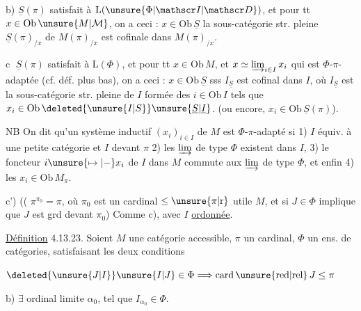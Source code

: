 
b) $\underline S(\pi)$ satisfait à $\mathrm L(\unsure{\Phi|\mathscr I|\mathscr D})$, et pour tt $x\in\mathrm{Ob}\,\unsure{M|\mathcal M}$, on a ceci : $x\in\mathrm{Ob}\,\underline S$  la sous-catégorie str. pleine $\underline S(\pi)_{/x}$ de $M(\pi)_{/x}$ est cofinale dans $M(\pi)_{/x}$.

\textcircled{c} $\underline S(\pi)$ satisfait à $\mathrm L(\Phi)$, et pour tt $x\in\mathrm{Ob}\,M$, et    $x\simeq\varinjlim_{i\in I}x_i$ qui est $\Phi$-$\pi$-adaptée (cf. déf. plus bas), on a ceci : $x\in\mathrm{Ob}\,\underline S$ sss $I_{\underline S}$ est cofinal dans $I$, où $I_{\underline S}$ est la sous-catégorie str. pleine de $I$ formée des $i\in\mathrm{Ob}\,I$ tels que $x_i\in\mathrm{Ob}\,\deleted{\unsure{I|S}}\unsure{\underline S|\underline I}$. (ou encore, $x_i\in\mathrm{Ob}\,\underline S(\pi)$).

NB On dit qu'un système inductif $(x_i)_{i\in I}$ de $M$ est $\Phi$-$\pi$-adapté si 1) $I$ équiv. à une petite catégorie et $I$  devant $\pi$ 2) les $\varinjlim$ de type $\Phi$ existent dans $I$, 3) le foncteur $i\unsure{\mapsto|-}x_i$ de $I$ dans $M$ commute aux $\varinjlim$ de type $\Phi$, et enfin 4) les $x_i\in\mathrm{Ob}\,M_\pi$.

c') (( $\pi^{\pi_0}=\pi$, où $\pi_0$ est un cardinal $\leq\unsure{\pi|\mathrm r}$ utile  $M$,  et si   $J\in\Phi$ implique que $J$ est grd devant $\pi_0$) Comme c), avec $I$ \uline{ordonnée}.




\uline{Définition} 4.13.23. Soient $M$ une catégorie accessible, $\pi$  un cardinal, $\Phi$ un ens. de catégories, satisfaisant les deux conditions

 $\deleted{\unsure{J|I}}\unsure{I|J}\in\Phi\Longrightarrow\mathrm{card}\,\unsure{\mathrm{red}|\mathrm{rel}}\,J\leq\pi$

b) $\exists$ ordinal limite $\alpha_0$, tel que $I_{\alpha_0}\in\Phi$.



